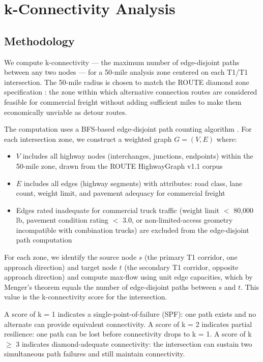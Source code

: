 \section{k-Connectivity Analysis}
\label{sec:k-connectivity}

\subsection{Methodology}

We compute k-connectivity --- the maximum number of edge-disjoint paths between any two nodes --- for a 50-mile analysis zone centered on each T1/T1 intersection. The 50-mile radius is chosen to match the ROUTE diamond zone specification \citep{ROUTE_B4}: the zone within which alternative connection routes are considered feasible for commercial freight without adding sufficient miles to make them economically unviable as detour routes.

The computation uses a BFS-based edge-disjoint path counting algorithm \citep{Brandes2001}. For each intersection zone, we construct a weighted graph $G = (V, E)$ where:
\begin{itemize}
\item $V$ includes all highway nodes (interchanges, junctions, endpoints) within the 50-mile zone, drawn from the ROUTE HighwayGraph v1.1 corpus
\item $E$ includes all edges (highway segments) with attributes: road class, lane count, weight limit, and pavement adequacy for commercial freight
\item Edges rated inadequate for commercial truck traffic (weight limit $<$ 80,000 lb, pavement condition rating $<$ 3.0, or non-limited-access geometry incompatible with combination trucks) are excluded from the edge-disjoint path computation
\end{itemize}

For each zone, we identify the source node $s$ (the primary T1 corridor, one approach direction) and target node $t$ (the secondary T1 corridor, opposite approach direction) and compute max-flow using unit edge capacities, which by Menger's theorem \citep{Menger1927} equals the number of edge-disjoint paths between $s$ and $t$. This value is the k-connectivity score for the intersection.

A score of k = 1 indicates a single-point-of-failure (SPF): one path exists and no alternate can provide equivalent connectivity. A score of k = 2 indicates partial resilience: one path can be lost before connectivity drops to k = 1. A score of k $\geq$ 3 indicates diamond-adequate connectivity: the intersection can sustain two simultaneous path failures and still maintain connectivity.

